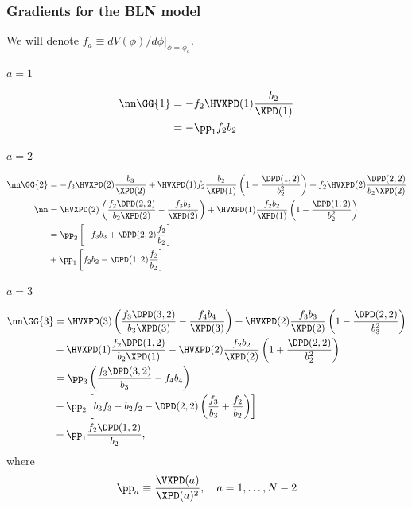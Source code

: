 \subsubsection{Gradients for the BLN model}

We will denote $f_a\equiv dV(\phi)/d\phi|_{\phi=\phi_a}$.

\paragraph{$a=1$}
\begin{align}
  \nn\GG{1}&=-f_2\HVXPD(1)\frac{b_2}{\XPD(1)}\\
	&=-\pp_1f_2b_2
\end{align}
\paragraph{$a=2$} 
  \begin{align}
    \nn\GG{2}&=-f_3\HVXPD(2)\frac{b_3}{\XPD(2)}+\HVXPD(1)f_2\frac{b_2}{\XPD(1)}
    \left(1-\frac{\DPD(1,2)}{b_2^2}\right)+
    f_2\HVXPD(2)\frac{\DPD(2,2)}{b_2\XPD(2)}\\
    \nn&=\HVXPD(2)\left(\frac{f_2\DPD(2,2)}{b_2\XPD(2)}-\frac{f_3b_3}{\XPD(2)}\right)
    +\HVXPD(1)\frac{f_2b_2}{\XPD(1)}\left(1-\frac{\DPD(1,2)}{b_2^2}\right)\\
    &=\pp_2\left[ -f_3b_3+\DPD(2,2)\frac{f_2}{b_2}\right]\\
    &+\pp_1\left[f_2b_2-\DPD(1,2)\frac{f_2}{b_2}\right]
  \end{align}
\paragraph{$a=3$}
  \begin{align}
    \nn\GG{3}&=
    \HVXPD(3)\left(\frac{f_3\DPD(3,2)}{b_3\XPD(3)}-\frac{f_4b_4}{\XPD(3)}\right)
    +\HVXPD(2)\frac{f_3b_3}{\XPD(2)}\left(1-\frac{\DPD(2,2)}{b_3^2}\right)\\
    &+\HVXPD(1)\frac{f_2\DPD(1,2)}{b_2\XPD(1)}
    -\HVXPD(2)\frac{f_2b_{2}}{\XPD(2)}\left(1+\frac{\DPD(2,2)}{b_2^2}\right)\\
    &= \pp_3
    \left(\frac{f_3\DPD(3,2)}{b_3}-f_4b_4\right)\\
    &+\pp_2\left[b_3f_3-b_2f_2-
    \DPD(2,2)\left(\frac{f_3}{b_3}+\frac{f_2}{b_2}\right)\right]\\
    &+\pp_1\frac{f_2\DPD(1,2)}{b_2},
  \end{align}
  where
  \begin{equation}
    \pp_a\equiv\frac{\VXPD(a)}{\XPD(a)^2},\quad a=1,\ldots,N-2
  \end{equation}


